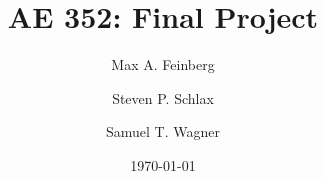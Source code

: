 \documentclass[a4paper]{article}
\title{AE 352: Final Project}
\author{Max A. Feinberg \and Steven P. Schlax \and  Samuel T. Wagner}
\date{\AdvanceDate[-1]\today}
\begin{document}
\newcommand{\nvar}[2]{%
    \newlength{#1}
    \setlength{#1}{#2}
}

\nvar{\dg}{0.3cm}
\def\dw{0.25}\def\dh{0.5}
\nvar{\ddx}{1.5cm}

\def\link{\draw [double distance=1.5mm, very thick] (0,0)--}
\def\joint{%
    \filldraw [fill=white] (0,0) circle (5pt);
    \fill[black] circle (2pt);
}
\def\grip{%
    \draw[ultra thick](0cm,\dg)--(0cm,-\dg);
    \fill (0cm, 0.5\dg)+(0cm,1.5pt) -- +(0.6\dg,0cm) -- +(0pt,-1.5pt);
    \fill (0cm, -0.5\dg)+(0cm,1.5pt) -- +(0.6\dg,0cm) -- +(0pt,-1.5pt);
}
\def\robotbase{%
    \draw[rounded corners=8pt] (-\dw,-\dh)-- (-\dw, 0) --
        (0,\dh)--(\dw,0)--(\dw,-\dh);
    \draw (-0.5,-\dh)-- (0.5,-\dh);
    \fill[pattern=north east lines] (-0.5,-1) rectangle (0.5,-\dh);
}

\newcommand{\angann}[2]{%
    \begin{scope}[red]
    \draw [dashed, red] (0,0) -- (1.2\ddx,0pt);
    \draw [->, shorten >=3.5pt] (\ddx,0pt) arc (0:#1:\ddx);
    \node at (#1/2-2:\ddx+8pt) {#2};
    \end{scope}
}

\newcommand{\lineann}[4][0.5]{%
    \begin{scope}[rotate=#2, blue,inner sep=2pt]
        \draw[dashed, blue!40] (0,0) -- +(0,#1)
            node [coordinate, near end] (a) {};
        \draw[dashed, blue!40] (#3,0) -- +(0,#1)
            node [coordinate, near end] (b) {};
        \draw[|<->|] (a) -- node[fill=white] {#4} (b);
    \end{scope}
}

\def\thetaone{30}
\def\Lone{2}
\def\thetatwo{20}
\def\Ltwo{2}
\def\thetathree{40}
\def\Lthree{1}









\maketitle
\end{document}
